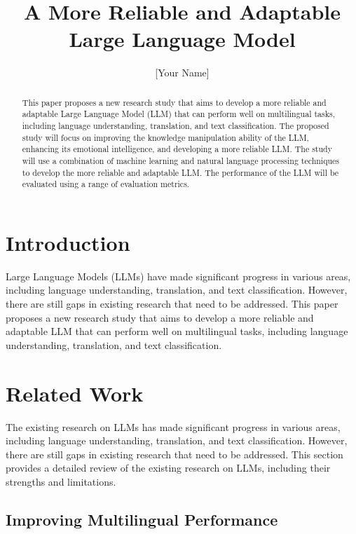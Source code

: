 \documentclass{article}
\begin{document}
\title{A More Reliable and Adaptable Large Language Model}

\author{[Your Name]}

\maketitle

\begin{abstract}
This paper proposes a new research study that aims to develop a more reliable and adaptable Large Language Model (LLM) that can perform well on multilingual tasks, including language understanding, translation, and text classification. The proposed study will focus on improving the knowledge manipulation ability of the LLM, enhancing its emotional intelligence, and developing a more reliable LLM. The study will use a combination of machine learning and natural language processing techniques to develop the more reliable and adaptable LLM. The performance of the LLM will be evaluated using a range of evaluation metrics.
\end{abstract}

\section{Introduction}

Large Language Models (LLMs) have made significant progress in various areas, including language understanding, translation, and text classification. However, there are still gaps in existing research that need to be addressed. This paper proposes a new research study that aims to develop a more reliable and adaptable LLM that can perform well on multilingual tasks, including language understanding, translation, and text classification.

\section{Related Work}

The existing research on LLMs has made significant progress in various areas, including language understanding, translation, and text classification. However, there are still gaps in existing research that need to be addressed. This section provides a detailed review of the existing research on LLMs, including their strengths and limitations.

\subsection{Improving Multilingual Performance}
\end{document}
